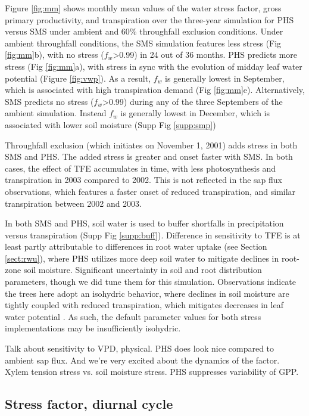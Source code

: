\documentclass[draft,linenumbers]{agujournal}
\begin{document}
Figure \ref{fig:mm} shows monthly mean values of the water stress factor, gross primary productivity, and transpiration
over the three-year simulation for PHS versus SMS under ambient and 60\% throughfall exclusion conditions.
Under ambient throughfall conditions, the SMS simulation features less stress (Fig \ref{fig:mm}b), with
no stress ($f_w$>0.99) in 24 out of 36 months.
PHS predicts more stress (Fig \ref{fig:mm}a), with stress in sync with the evolution of midday leaf water potential (Figure \ref{fig:vwp}).
As a result, $f_w$ is generally lowest in September, which is associated with high transpiration demand (Fig \ref{fig:mm}e).
Alternatively, SMS predicts no stress ($f_w$>0.99) during any of the three Septembers of the ambient simulation.
Instead $f_w$ is generally lowest in December, which is associated with lower soil moisture (Supp Fig \ref{supp:smp})

Throughfall exclusion (which initiates on November 1, 2001) adds stress in both SMS and PHS.
The added stress is greater and onset faster with SMS.
In both cases, the effect of TFE accumulates in time, with less photosynthesis and transpiration in 2003 compared to 2002.
This is not reflected in the sap flux observations, which features a faster onset of reduced transpiration, and similar transpiration between 2002 and 2003.

In both SMS and PHS, soil water is used to buffer shortfalls in precipitation versus transpiration (Supp Fig \ref{supp:buff}).
Difference in sensitivity to TFE is at least partly attributable to differences in root water uptake (see Section \ref{sect:rwu}), 
where PHS utilizes more deep soil water to mitigate declines in root-zone soil moisture.
Significant uncertainty in soil and root distribution parameters, though we did tune them for this simulation.
Observations indicate the trees here adopt an isohydric behavior, where declines in soil moisture 
are tightly coupled with reduced transpiration, which mitigates decreases in leaf water potential \citep{fisher2006}.
As such, the default parameter values for both stress implementations may be insufficiently isohydric.

Talk about sensitivity to VPD, physical.
PHS does look nice compared to ambient sap flux.
And we're very excited about the dynamics of the factor.
Xylem tension stress vs. soil moisture stress.
PHS suppresses variability of GPP.


\subsection{Stress factor, diurnal cycle}
\end{document}
